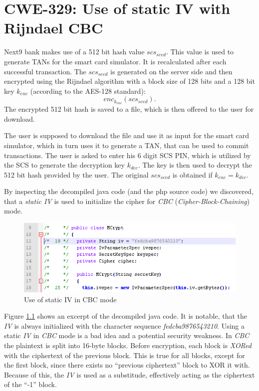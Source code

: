 \chapter{CWE-329: Use of static IV with Rijndael CBC}

Next9 bank makes use of a 512 bit hash value $scs_{seed}$. This value is used to generate TANs for the smart card simulator. It is recalculated after each successful transaction. The $scs_{seed}$ is generated on the server side and then encrypted using the Rijndael algorithm with a block size of 128 bits and a 128 bit key $k_{enc}$ (according to the AES-128 standard): $$enc_{k_{enc}} (scs_{seed}).$$
The encrypted 512 bit hash is saved to a file, which is then offered to the user for download. 

The user is supposed to download the file and use it as input for the smart card simulator, which in turn uses it to generate a TAN, that can be used to commit transactions. The user is asked to enter his 6 digit SCS PIN, which is utilized by the SCS to generate the decryption key $k_{dec}$. The key is then used to decrypt the 512 bit hash provided by the user. The original $scs_{seed}$ is obtained if $k_{enc} = k_{dec}$.

By inspecting the decompiled java code (and the php source code) we discovered, that a \emph{static IV} is used to initialize the cipher for \emph{CBC} (\emph{Cipher-Block-Chaining}) mode.
\begin{center}
\begin{figure}[hbtp]
        \centering
        \includegraphics[natwidth=162bp,natheight=227bp]{staticIV.png}
        \caption{Use of static IV in CBC mode}\label{figStaticIV}
\end{figure}
\end{center}

Figure \ref{figStaticIV} shows an excerpt of the decompiled java code. It is notable, that the \emph{IV} is always initialized with the character sequence \emph{fedcba9876543210}. Using a static \emph{IV} in \emph{CBC} mode is a bad idea and a potential security weakness. In \emph{CBC} the plaintext is split into 16-byte blocks. Before encryption, each block is \emph{XORed} with the ciphertext of the previous block. This is true for all blocks, except for the first block, since there exists no ``previous ciphertext'' block to XOR it with. Because of this, the \emph{IV} is used as a substitude, effectively acting as the ciphertext of the ``-1'' block.

